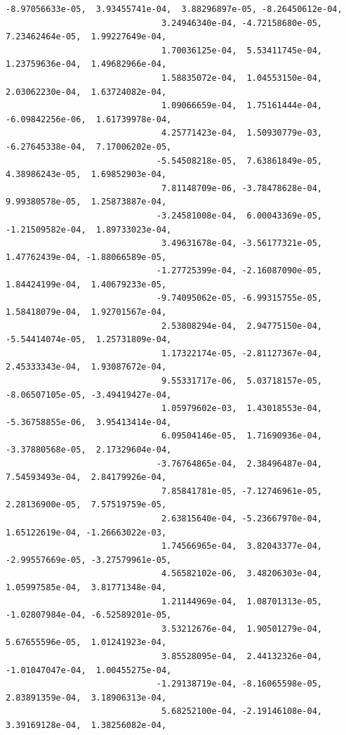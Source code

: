 \documentclass[11pt]{article}
\begin{document}
\begin{Verbatim}[commandchars=\\\{\}]
                              -8.97056633e-05,  3.93455741e-04,  3.88296897e-05, -8.26450612e-04,
                               3.24946340e-04, -4.72158680e-05,  7.23462464e-05,  1.99227649e-04,
                               1.70036125e-04,  5.53411745e-04,  1.23759636e-04,  1.49682966e-04,
                               1.58835072e-04,  1.04553150e-04,  2.03062230e-04,  1.63724082e-04,
                               1.09066659e-04,  1.75161444e-04, -6.09842256e-06,  1.61739978e-04,
                               4.25771423e-04,  1.50930779e-03, -6.27645338e-04,  7.17006202e-05,
                              -5.54508218e-05,  7.63861849e-05,  4.38986243e-05,  1.69852903e-04,
                               7.81148709e-06, -3.78478628e-04,  9.99380578e-05,  1.25873887e-04,
                              -3.24581008e-04,  6.00043369e-05, -1.21509582e-04,  1.89733023e-04,
                               3.49631678e-04, -3.56177321e-05,  1.47762439e-04, -1.88066589e-05,
                              -1.27725399e-04, -2.16087090e-05,  1.84424199e-04,  1.40679233e-05,
                              -9.74095062e-05, -6.99315755e-05,  1.58418079e-04,  1.92701567e-04,
                               2.53808294e-04,  2.94775150e-04, -5.54414074e-05,  1.25731809e-04,
                               1.17322174e-05, -2.81127367e-04,  2.45333343e-04,  1.93087672e-04,
                               9.55331717e-06,  5.03718157e-05, -8.06507105e-05, -3.49419427e-04,
                               1.05979602e-03,  1.43018553e-04, -5.36758855e-06,  3.95413414e-04,
                               6.09504146e-05,  1.71690936e-04, -3.37880568e-05,  2.17329604e-04,
                              -3.76764865e-04,  2.38496487e-04,  7.54593493e-04,  2.84179926e-04,
                               7.85841781e-05, -7.12746961e-05,  2.28136900e-05,  7.57519759e-05,
                               2.63815640e-04, -5.23667970e-04,  1.65122619e-04, -1.26663022e-03,
                               1.74566965e-04,  3.82043377e-04, -2.99557669e-05, -3.27579961e-05,
                               4.56582102e-06,  3.48206303e-04,  1.05997585e-04,  3.81771348e-04,
                               1.21144969e-04,  1.08701313e-05, -1.02807984e-04, -6.52589201e-05,
                               3.53212676e-04,  1.90501279e-04,  5.67655596e-05,  1.01241923e-04,
                               3.85528095e-04,  2.44132326e-04, -1.01047047e-04,  1.00455275e-04,
                              -1.29138719e-04, -8.16065598e-05,  2.83891359e-04,  3.18906313e-04,
                               5.68252100e-04, -2.19146108e-04,  3.39169128e-04,  1.38256082e-04,

\end{Verbatim}
\end{document}
